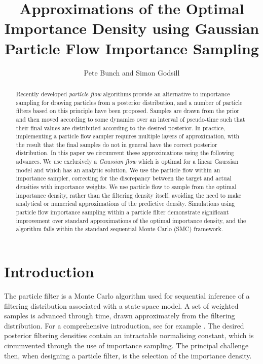 \documentclass{article}
\title{Approximations of the Optimal Importance Density using Gaussian Particle Flow Importance Sampling}
\author{Pete Bunch and Simon Godsill}
\date{}
\begin{document}
\maketitle

\begin{abstract}
Recently developed \emph{particle flow} algorithms provide an alternative to importance sampling for drawing particles from a posterior distribution, and a number of particle filters based on this principle have been proposed. Samples are drawn from the prior and then moved according to some dynamics over an interval of pseudo-time such that their final values are distributed according to the desired posterior. In practice, implementing a particle flow sampler requires multiple layers of approximation, with the result that the final samples do not in general have the correct posterior distribution. In this paper we circumvent these approximations using the following advances. We use exclusively a \emph{Gaussian flow} which is optimal for a linear Gaussian model and which has an analytic solution. We use the particle flow within an importance sampler, correcting for the discrepancy between the target and actual densities with importance weights. We use particle flow to sample from the optimal importance density, rather than the filtering density itself, avoiding the need to make analytical or numerical approximations of the predictive density. Simulations using particle flow importance sampling within a particle filter demonstrate significant improvement over standard approximations of the optimal importance density, and the algorithm falls within the standard sequential Monte Carlo (SMC) framework.
\end{abstract}





\doublespacing

\section{Introduction}

The particle filter is a Monte Carlo algorithm used for sequential inference of a filtering distribution associated with a state-space model. A set of weighted samples is advanced through time, drawn approximately from the filtering distribution. For a comprehensive introduction, see for example \citep{Cappe2007,Doucet2009}. The desired posterior filtering densities contain an intractable normalising constant, which is circumvented through the use of importance sampling. The principal challenge then, when designing a particle filter, is the selection of the importance density.
\end{document}
